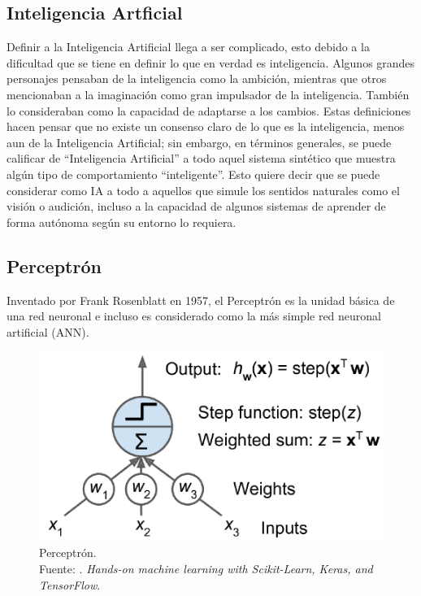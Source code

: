 \subsection{Inteligencia Artficial}
Definir a la Inteligencia Artificial llega a ser complicado, esto debido a la dificultad que se tiene en definir lo que en verdad es inteligencia. Algunos grandes personajes pensaban de la inteligencia como la ambición, mientras que otros mencionaban a la imaginación como gran impulsador de la inteligencia. También lo consideraban como la capacidad de adaptarse a los cambios. Estas definiciones hacen pensar que no existe un consenso claro de lo que es la inteligencia, menos aun de la Inteligencia Artificial; sin embargo, en términos generales, se puede calificar de “Inteligencia Artificial” a todo aquel sistema sintético que muestra algún tipo de comportamiento “inteligente”. Esto quiere decir que se puede considerar como IA a todo a aquellos que simule los sentidos naturales como el visión o audición, incluso a la capacidad de algunos sistemas de aprender de forma autónoma según su entorno lo requiera. \parencite{bk_hurbans2020grokking}

\subsection{Perceptrón}
Inventado por Frank Rosenblatt en 1957, el Perceptrón es la unidad básica de una red neuronal e incluso es considerado como la más simple red neuronal artificial (ANN). \parencite{bk_geron2022handml}

\begin{figure}[H]
	\begin{center}
		\includegraphics[width=1.00\textwidth]{2/figures/perceptron.png}
		\caption[Perceptrón]{Perceptrón. \\
		Fuente: \cite{bk_geron2022handml}. \textit{Hands-on machine learning with Scikit-Learn, Keras, and TensorFlow}.}
		\label{2:fig207}
	\end{center}
\end{figure}


